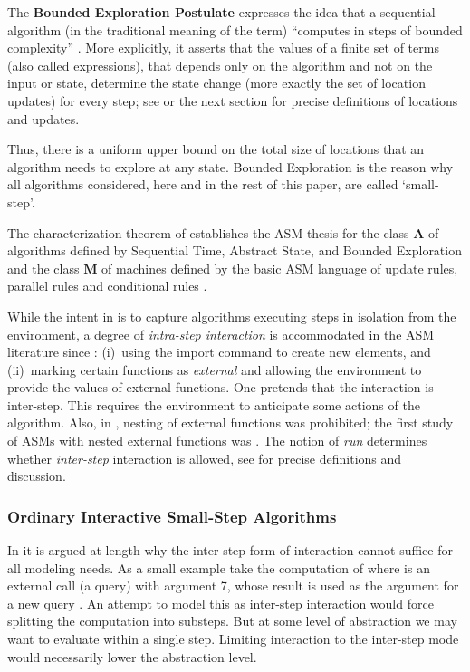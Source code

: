 \documentclass{LMCS}
\theoremstyle{definition}
\newcommand{\bld}[1]{\ensuremath{\mathbf {#1}}}
\begin{document}
The \textbf{Bounded Exploration Postulate} expresses the idea that a
sequential algorithm (in the traditional meaning of the term)
``computes in steps of bounded complexity'' \cite{K53}.  More
explicitly, it asserts that the values of a finite set  of terms
(also called expressions), that depends only on the algorithm and not
on the input or state, determine the state change (more exactly the
set of location updates) for every step; see \cite{lipari,seqth} or
the next section for precise definitions of locations and updates.

Thus, there is a uniform upper bound on the total size of locations
that an algorithm needs to explore at any state.  Bounded Exploration
is the reason why all algorithms considered, here and in the rest of
this paper, are called `small-step'.

The characterization theorem of \cite{seqth} establishes the ASM
thesis for the class \bld{A} of algorithms defined by Sequential Time,
Abstract State, and Bounded Exploration and the class \bld{M} of
machines defined by the basic ASM language of update rules, parallel
rules and conditional rules \cite{tutorial,lipari,seqth}.

While the intent in \cite{seqth} is to capture algorithms executing
steps in isolation from the environment, a degree of \emph{intra-step
  interaction} is accommodated in the ASM literature since
\cite{lipari}: (i)~using the import command to create new elements,
and (ii)~marking certain functions as \emph{external} and allowing the
environment to provide the values of external functions.  One pretends
that the interaction is inter-step.  This requires the environment to
anticipate some actions of the algorithm.  Also, in \cite{lipari},
nesting of external functions was prohibited; the first study of ASMs
with nested external functions was \cite{oa2}.  The notion of
\emph{run} determines whether \emph{inter-step} interaction is
allowed, see \cite{lipari,seqth} for precise definitions and
discussion.


\subsubsection{Ordinary Interactive Small-Step
Algorithms}\label{sec:overview:oa}

In \cite{oa1} it is argued at length why the inter-step form of
interaction cannot suffice for all modeling needs.  As a small example
take the computation of  where  is an external call (a
query) with argument 7, whose result  is used as the argument for a
new query .  An attempt to model this as inter-step interaction
would force splitting the computation into substeps. But at some level
of abstraction we may want to evaluate  within a single step.
Limiting interaction to the inter-step mode would necessarily lower
the abstraction level.
\end{document}
